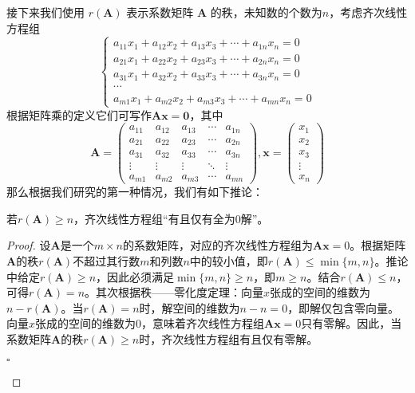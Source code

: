 接下来我们使用 $r(\mathbf{A})$ 表示系数矩阵 $\mathbf{A}$ 的秩，未知数的个数为$n$，考虑齐次线性方程组$$\left\{\begin{matrix} 
		a_{11}x_1+a_{12}x_2+a_{13}x_3+\cdots+a_{1n}x_n=0 \\  
		a_{21}x_1+a_{22}x_2+a_{23}x_3+\cdots+a_{2n}x_n=0 \\  
		a_{31}x_1+a_{32}x_2+a_{33}x_3+\cdots+a_{3n}x_n=0 \\
		\cdots \\
		a_{m1}x_1+a_{m2}x_2+a_{m3}x_3+\cdots+a_{mn}x_n=0
	\end{matrix}\right. $$根据矩阵乘的定义它们可写作$\mathbf{A}\mathbf{x}=\boldsymbol{0}$，其中$$\mathbf{A}=\begin{pmatrix}
		a_{11} & a_{12} & a_{13} & \cdots & a_{1n}\\
		a_{21} & a_{22} & a_{23} & \cdots & a_{2n}\\
		a_{31} & a_{32} & a_{33} & \cdots & a_{3n}\\
		\vdots & \vdots & \vdots & \ddots & \vdots\\
		a_{m1} & a_{m2} & a_{m3} & \cdots & a_{mn}
	\end{pmatrix},\mathbf{x}=\begin{pmatrix}
		x_1\\
		x_2\\
		x_3\\
		\vdots\\
		x_n
	\end{pmatrix}$$
那么根据我们研究的第一种情况，我们有如下推论：

\begin{corollary}
	若$r(\mathbf{A})\geq n$，齐次线性方程组``有且仅有全为0解''。
\end{corollary}

\begin{proof}
	设$\mathbf{A}$是一个$m \times n$的系数矩阵，对应的齐次线性方程组为$\mathbf{A}\mathbf{x} = 0$。根据矩阵$\mathbf{A}$的秩$r(\mathbf{A})$不超过其行数$m$和列数$n$中的较小值，即$r(\mathbf{A}) \leq \min\{m, n\}$。推论中给定$r(\mathbf{A}) \geq n$，因此必须满足$\min\{m, n\} \geq n$，即$m \geq n$。结合$r(\mathbf{A}) \leq n$，可得$r(\mathbf{A}) = n$。其次根据秩——零化度定理：向量$x$张成的空间的维数为$n - r(\mathbf{A})$。当$r(\mathbf{A}) = n$时，解空间的维数为$n - n = 0$，即解仅包含零向量。向量$x$张成的空间的维数为0，意味着齐次线性方程组$\mathbf{A}\mathbf{x} = 0$只有零解。因此，当系数矩阵$\mathbf{A}$的秩$r(\mathbf{A}) \geq n$时，齐次线性方程组有且仅有零解。\begin{flushright}
		$\square$
	\end{flushright}
\end{proof}

